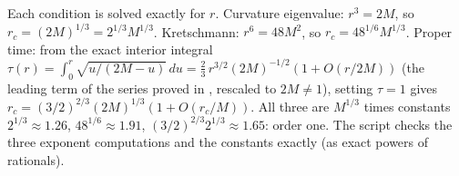 Each condition is solved exactly for $r$. Curvature eigenvalue: $r^3 = 2M$, so $r_c = (2M)^{1/3} = 2^{1/3}M^{1/3}$. Kretschmann: $r^6 = 48M^2$, so $r_c = 48^{1/6}M^{1/3}$. Proper time: from the exact interior integral $\tau(r) = \int_0^r \sqrt{u/(2M - u)}\,du = \tfrac{2}{3}\,r^{3/2}(2M)^{-1/2}(1 + O(r/2M))$ (the leading term of the series proved in \cite[Lem.~5.1]{ButlerT6}, rescaled to $2M \neq 1$), setting $\tau = 1$ gives $r_c = (3/2)^{2/3}(2M)^{1/3}(1 + O(r_c/M))$. All three are $M^{1/3}$ times constants $2^{1/3} \approx 1.26$, $48^{1/6} \approx 1.91$, $(3/2)^{2/3}2^{1/3} \approx 1.65$: order one. The script checks the three exponent computations and the constants exactly (as exact powers of rationals).
